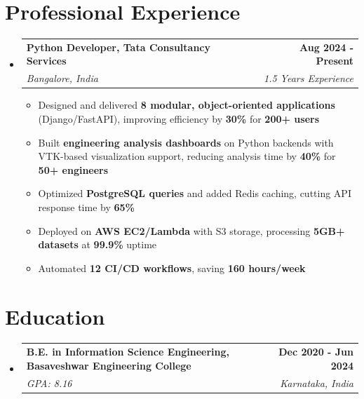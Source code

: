 \documentclass[letterpaper,11pt]{article}
\makeatletter
\newif\ifshowprojects
\newcommand{\resumeItem}[1]{\item\small{{#1 \vspace{-2pt}}}}
\newcommand{\resumeSubheading}[4]{
  \vspace{-2pt}\item
    \begin{tabular*}{1.0\textwidth}[t]{l@{\extracolsep{\fill}}r}
      \textbf{#1} & \textbf{#2} \\
      \textit{#3} & \textit{#4} \\
    \end{tabular*}\vspace{-7pt}
}
\newcommand{\resumeSubHeadingListStart}{\begin{itemize}[leftmargin=0.0in, label={}]}
\newcommand{\resumeSubHeadingListEnd}{\end{itemize}}
\newcommand{\resumeItemListStart}{\begin{itemize}}
\newcommand{\resumeItemListEnd}{\end{itemize}\vspace{-6pt}}
\makeatother
\begin{document}
\section{Professional Experience}
\resumeSubHeadingListStart

\resumeSubheading
  {Python Developer, Tata Consultancy Services}{Aug 2024 - Present}
  {Bangalore, India}{1.5 Years Experience}
  \resumeItemListStart
    \resumeItem{Designed and delivered \textbf{8 modular, object-oriented applications} (Django/FastAPI), improving efficiency by \textbf{30\%} for \textbf{200+ users}}
    \resumeItem{Built \textbf{engineering analysis dashboards} on Python backends with VTK-based visualization support, reducing analysis time by \textbf{40\%} for \textbf{50+ engineers}}
    \resumeItem{Optimized \textbf{PostgreSQL queries} and added Redis caching, cutting API response time by \textbf{65\%}}
    \resumeItem{Deployed on \textbf{AWS EC2/Lambda} with S3 storage, processing \textbf{5GB+ datasets} at \textbf{99.9\%} uptime}
    \resumeItem{Automated \textbf{12 CI/CD workflows}, saving \textbf{160 hours/week}}
  \resumeItemListEnd

\resumeSubHeadingListEnd

\ifshowprojects
\section{Projects}
\resumeSubHeadingListStart

\resumeSubheading
  {Multithreaded C++17 Mesh Processing Library}{2026}
  {C++17, std::thread, CMake, Git}{}
  \resumeItemListStart
    \resumeItem{Implemented a \textbf{thread pool} with task queue (mutex + condition variable) and a \textbf{parallel reduction} for mesh bounding-box and statistics}
    \resumeItem{Applied \textbf{RAII, smart pointers and polymorphic mesh readers} (Factory pattern) with a CMake build}
    \resumeItem{Benchmarked serial vs.\ parallel execution and verified thread safety with sanitizers/stress tests}
  \resumeItemListEnd

\resumeSubHeadingListEnd
\fi

\section{Education}
\resumeSubHeadingListStart
  \resumeSubheading
    {B.E. in Information Science Engineering, Basaveshwar Engineering College}{Dec 2020 - Jun 2024}
    {GPA: 8.16}{Karnataka, India}
\resumeSubHeadingListEnd
\end{document}
